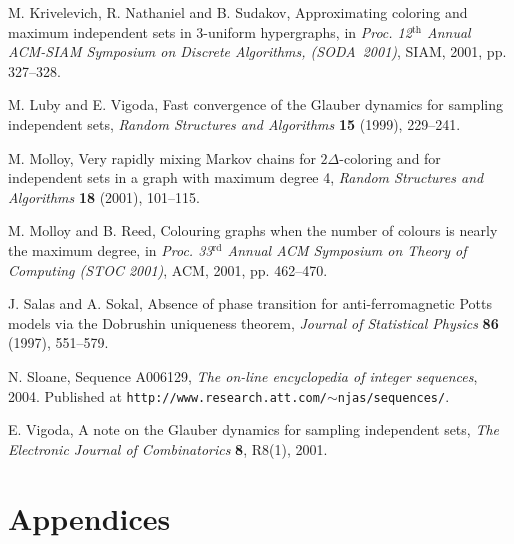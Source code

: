 \documentclass[11pt]{article}
\theoremstyle{definition}
\theoremstyle{remark}
\begin{document}
\begin{thebibliography}{99}
 M. Krivelevich, R. Nathaniel and B. Sudakov,
Approximating coloring and maximum independent sets in 3-uniform
hypergraphs, in \emph{Proc. 12${}^\textrm{th}$ Annual ACM-SIAM Symposium on
Discrete Algorithms, (SODA~2001)}, SIAM, 2001, pp. 327--328.

 M. Luby and E. Vigoda, Fast convergence of the Glauber dynamics
for sampling independent sets, \emph{Random Structures and
Algorithms} \textbf{15} (1999), 229--241.

 M. Molloy, Very rapidly mixing Markov chains for $2\Delta$-coloring
and for independent sets in a graph with maximum degree 4,
\emph{Random Structures and Algorithms} \textbf{18} (2001),
101--115.

 M. Molloy and B. Reed, Colouring graphs when the
number of colours is nearly the maximum degree, in \emph{Proc.
33${}^\textrm{rd}$ Annual ACM Symposium on Theory of Computing (STOC
2001)}, ACM, 2001, pp. 462--470.

 J. Salas and A. Sokal, Absence of phase transition
for anti-ferromagnetic Potts models via the Dobrushin uniqueness theorem,
\emph{Journal of Statistical Physics} \textbf{86} (1997), 551--579.

 N. Sloane, Sequence A006129,
\emph{The on-line encyclopedia of integer sequences},
 2004. Published at
\texttt{http://www.research.att.com/$\sim$njas/sequences/}.

 E. Vigoda, A note on the Glauber dynamics for sampling
independent sets, \emph{The Electronic Journal of Combinatorics}
\textbf{8}, R8(1), 2001.
\end{thebibliography}

\appendix

\section*{Appendices}
\end{document}
